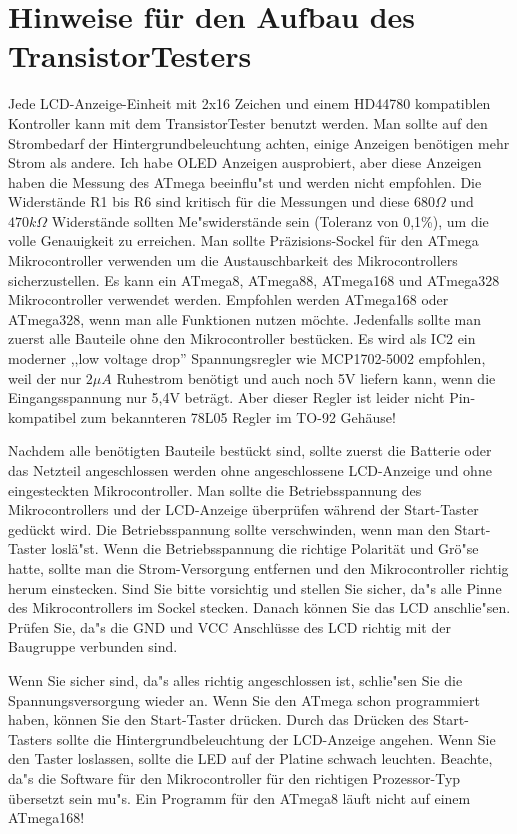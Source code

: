 \section{Hinweise f\"ur den Aufbau des TransistorTesters}
Jede LCD-Anzeige-Einheit mit 2x16 Zeichen und einem HD44780 kompatiblen Kontroller kann mit
dem TransistorTester benutzt werden.
Man sollte auf den Strombedarf der Hintergrundbeleuchtung achten, einige Anzeigen ben\"otigen
mehr Strom als andere.
Ich habe OLED Anzeigen ausprobiert, aber diese Anzeigen haben die Messung des
ATmega beeinflu"st und werden nicht empfohlen.
Die Widerst\"ande R1 bis R6 sind kritisch f\"ur die Messungen und diese \(680\Omega\) und
\(470k\Omega\) Widerst\"ande sollten Me"swiderst\"ande sein (Toleranz von 0,1\%), um 
die volle Genauigkeit zu erreichen.
Man sollte Pr\"azisions-Sockel f\"ur den ATmega Mikrocontroller verwenden um
die Austauschbarkeit des Mikrocontrollers sicherzustellen.
Es kann ein ATmega8, ATmega88, ATmega168 und ATmega328 Mikrocontroller verwendet werden.
Empfohlen werden ATmega168 oder ATmega328, wenn man alle Funktionen nutzen m\"ochte.
Jedenfalls sollte man zuerst alle Bauteile ohne den Mikrocontroller best\"ucken.
Es wird als IC2 ein moderner ,,low voltage drop'' Spannungsregler wie MCP1702-5002 empfohlen, weil
der nur \(2\mu A\) Ruhestrom ben\"otigt und auch noch 5V liefern kann, 
 wenn die Eingangsspannung nur 5,4V betr\"agt.
Aber dieser Regler ist leider nicht Pin-kompatibel zum bekannteren 78L05 Regler im TO-92 Geh\"ause!

Nachdem alle ben\"otigten Bauteile best\"uckt sind, sollte zuerst die Batterie
oder das Netzteil angeschlossen werden ohne angeschlossene LCD-Anzeige
und ohne eingesteckten Mikrocontroller.
Man sollte die Betriebsspannung des Mikrocontrollers und der LCD-Anzeige
\"uberpr\"ufen w\"ahrend der Start-Taster ged\"uckt wird.
Die Betriebsspannung sollte verschwinden, wenn man den Start-Taster losl\"a"st.
Wenn die Betriebsspannung die richtige Polarit\"at und Gr\"o"se hatte,
sollte man die Strom-Versorgung entfernen und den Mikrocontroller 
richtig herum einstecken. Sind Sie bitte vorsichtig und stellen Sie sicher,
da"s alle Pinne des Mikrocontrollers im Sockel stecken.
Danach k\"onnen Sie das LCD anschlie"sen. Pr\"ufen Sie, da"s die GND und VCC
Anschl\"usse des LCD richtig mit der Baugruppe verbunden sind.

Wenn Sie sicher sind, da"s alles richtig angeschlossen ist, schlie"sen Sie
die Spannungsversorgung wieder an.
Wenn Sie den ATmega schon programmiert haben, k\"onnen Sie den Start-Taster
dr\"ucken.
Durch das Dr\"ucken des Start-Tasters sollte die Hintergrundbeleuchtung
der LCD-Anzeige angehen.
Wenn Sie den Taster loslassen, sollte die LED auf der Platine schwach leuchten.
Beachte, da"s die Software f\"ur den Mikrocontroller f\"ur den richtigen
Prozessor-Typ \"ubersetzt sein mu"s. Ein Programm f\"ur den ATmega8 l\"auft
nicht auf einem ATmega168!

